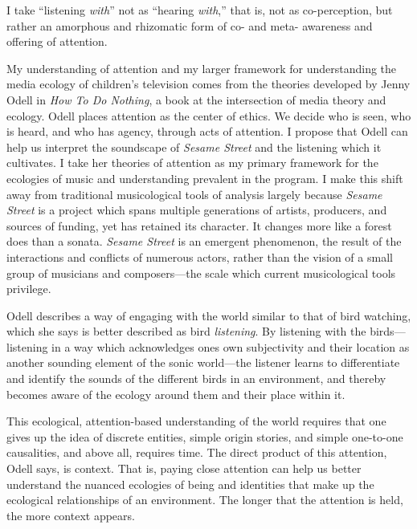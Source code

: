 \documentclass[12pt,letterpaper]{article}
\newcommand{\ses}{\textit{Sesame Street }}
\begin{document}
	I take ``listening \textit{with}'' not as ``hearing \textit{with},'' 
	that is, not as co-perception, but rather an amorphous and rhizomatic
	form of co- and meta- awareness and offering of attention.  

	My understanding of attention and my larger framework for understanding
	the media ecology of children's television comes from the theories 
	developed by Jenny Odell in 
	\textit{How To Do Nothing}, a book at the intersection of media theory
	and ecology. Odell places attention as the center of ethics. We decide 
	who is seen, who is heard, and who has agency, through acts of 
	attention. \autocite[154]{Odell} I propose that Odell can help us 
	interpret the soundscape of \textit{Sesame Street} and the listening
	which it cultivates. I take her theories of attention as my primary
	framework for the ecologies of music and understanding
	prevalent in the program. I make this shift away from traditional
	musicological tools of analysis largely because \ses is a project which
	spans multiple generations of artists, producers, and sources of
	funding, yet has retained its character. It changes more like a forest
	does than a sonata. \ses is an emergent phenomenon, the result of the
	interactions and conflicts of numerous actors, rather than the vision
	of a small group of musicians and composers---the scale which current 
	musicological tools privilege. 

	Odell describes a way of engaging with the 
	world similar to that of bird watching, which she says is better 
	described as bird \textit{listening}.
	By listening with the birds---listening in a way which acknowledges
	ones own subjectivity and their location as another sounding element of
	the sonic world---the listener learns to differentiate and identify 
	the sounds 
	of the different birds in an environment, and thereby becomes aware
	of the ecology around them and their place within 
	it.\autocite[33/366]{Odell} 

	
	This ecological, attention-based understanding of the world requires 
	that one gives up the idea of discrete entities, simple origin stories,
	and simple one-to-one causalities, and above all, requires time.
	The direct product of this attention, Odell says, is context. 
	That is, paying close attention can help us better understand the 
	nuanced ecologies of being and identities that make up the ecological
	relationships of an environment. The longer that the attention is held, 
	the more context appears.\autocite[155]{Odell} 
\end{document}
